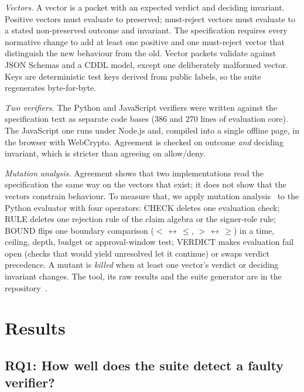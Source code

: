 \documentclass[conference]{IEEEtran}
\newcommand{\pres}{\textsf{preserved}}
\newcommand{\unres}{\textsf{unresolved}}
\begin{document}
\emph{Vectors.} A vector is a packet with an expected verdict and deciding invariant. Positive vectors must evaluate to \pres{}; must-reject vectors must evaluate to a stated non-\pres{} outcome and invariant. The specification requires every normative change to add at least one positive and one must-reject vector that distinguish the new behaviour from the old. Vector packets validate against JSON Schemas and a CDDL model, except one deliberately malformed vector. Keys are deterministic test keys derived from public labels, so the suite regenerates byte-for-byte.

\emph{Two verifiers.} The Python and JavaScript verifiers were written against the specification text as separate code bases (386 and 270 lines of evaluation core). The JavaScript one runs under Node.js and, compiled into a single offline page, in the browser with WebCrypto. Agreement is checked on outcome \emph{and} deciding invariant, which is stricter than agreeing on allow/deny.

\emph{Mutation analysis.} Agreement shows that two implementations read the specification the same way on the vectors that exist; it does not show that the vectors constrain behaviour. To measure that, we apply mutation analysis~\cite{jia2011} to the Python evaluator with four operators: CHECK deletes one evaluation check; RULE deletes one rejection rule of the claim algebra or the signer-role rule; BOUND flips one boundary comparison ($<\,\leftrightarrow\,\le$, $>\,\leftrightarrow\,\ge$) in a time, ceiling, depth, budget or approval-window test; VERDICT makes evaluation fail open (checks that would yield \unres{} let it continue) or swaps verdict precedence. A mutant is \emph{killed} when at least one vector's verdict or deciding invariant changes. The tool, its raw results and the suite generator are in the repository~\cite{amep}.

\section{Results}\label{sec:results}

\subsection*{RQ1: How well does the suite detect a faulty verifier?}
\end{document}
